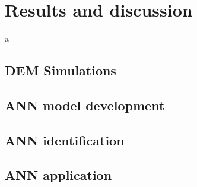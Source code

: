 
\section{Results and discussion}
\label{sec:results}




a



\subsection{DEM Simulations}
\label{subsec:simulations}
\lipsum[1]





\subsection{ANN model development}
\label{subsec:annmodeldev}
\lipsum[1]


\subsection{ANN identification}
\label{subsec:annmodeliden}
\lipsum[1]


\subsection{ANN application}
\label{subsec:annapplication}
\lipsum[1]







